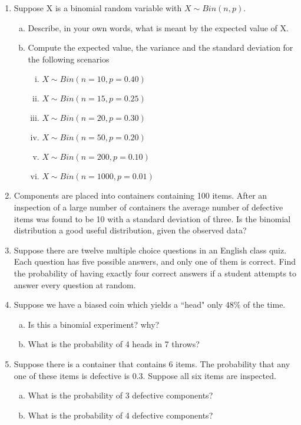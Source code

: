 \documentclass[a4paper,12pt]{article}
\begin{document}
\begin{enumerate}
\item
Suppose X is a binomial random variable with
$X \sim Bin(n, p)$.
\begin{enumerate}[(a)]
\item  Describe, in your own words, what is meant by the expected value of X.
\item  Compute the expected value, the variance and the standard deviation for the following scenarios

\begin{multicols}{2}
\begin{enumerate}[(i)]
	\item $X \sim Bin(n = 10, p = 0.40)$
	\item $X \sim Bin(n = 15, p = 0.25)$
	\item $X \sim Bin(n = 20, p = 0.30)$
	\item $X \sim Bin(n = 50, p = 0.20)$
	\item $X \sim Bin(n = 200, p = 0.10)$
	\item $X \sim Bin(n = 1000, p = 0.01)$
\end{enumerate}
\end{multicols}
\end{enumerate}


\item Components are placed into containers containing 100 items. After an inspection of a large number of containers the average number of defective items was found to be 10 with a standard deviation of three.
Is the binomial distribution a good useful distribution, given the observed data?


	
\item Suppose there are twelve multiple choice questions in an English class quiz. Each question has five possible answers, and only one of them is correct. Find the probability of having exactly four correct answers if a student attempts to answer every question at random.	
	
	\item Suppose we have a biased coin which yields a ``head" only $48\%$ of the time.
\begin{enumerate}[(a)]
	

	\item Is this a binomial experiment?  why?
	\item What is the probability of 4 heads in 7 throws?

\end{enumerate}
\item Suppose there is a container that contains 6 items.  The probability that any one of these items is defective is 0.3. Suppose all six items are inspected. 
	\begin{enumerate}[(a)]
		\item What is the probability of 3 defective components?
		\item What is the probability of 4 defective components?
	\end{enumerate}
	

\end{enumerate}
\end{document}
